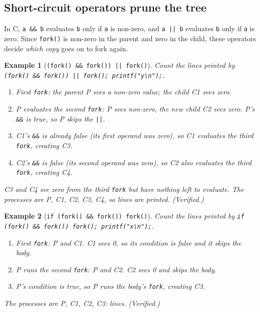 \documentclass[11pt]{article}
\newtheorem{example}{Example}
\begin{document}
\subsection{Short-circuit operators prune the tree}

In C, \texttt{a \&\& b} evaluates \texttt{b} only if \texttt{a} is non-zero,
and \texttt{a || b} evaluates \texttt{b} only if \texttt{a} is zero. Since
\texttt{fork()} is non-zero in the parent and zero in the child, these
operators decide \emph{which copy} goes on to fork again.

\begin{example}[\texttt{(fork() \&\& fork()) || fork()}]
\label{ex:shortcircuit}
Count the lines printed by
\texttt{(fork() \&\& fork()) || fork(); printf("y\textbackslash n");}.
\begin{enumerate}
  \item First \texttt{fork}: the parent P sees a non-zero value; the child C1
    sees zero.
  \item P evaluates the second \texttt{fork}: P sees non-zero, the new child
    C2 sees zero. P's \texttt{\&\&} is true, so P skips the \texttt{||}.
  \item C1's \texttt{\&\&} is already false (its first operand was zero), so
    C1 evaluates the third \texttt{fork}, creating C3.
  \item C2's \texttt{\&\&} is false (its second operand was zero), so C2 also
    evaluates the third \texttt{fork}, creating C4.
\end{enumerate}
C3 and C4 see zero from the third \texttt{fork} but have nothing left to
evaluate. The processes are P, C1, C2, C3, C4, so  lines are printed.
(Verified.)
\end{example}

\begin{example}[\texttt{if (fork() \&\& fork()) fork()}]
\label{ex:iffork}
Count the lines printed by
\texttt{if (fork() \&\& fork()) fork(); printf("x\textbackslash n");}.
\begin{enumerate}
  \item First \texttt{fork}: P and C1. C1 sees 0, so its condition is false and
    it skips the body.
  \item P runs the second \texttt{fork}: P and C2. C2 sees 0 and skips the body.
  \item P's condition is true, so P runs the body's \texttt{fork}, creating C3.
\end{enumerate}
The processes are P, C1, C2, C3:  lines. (Verified.)
\end{example}
\end{document}
